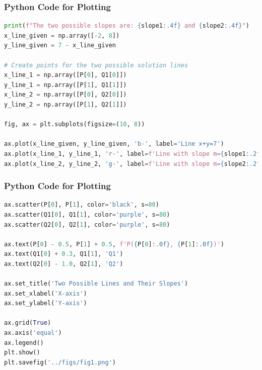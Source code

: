 \documentclass{beamer}
\theoremstyle{remark}
\numberwithin{equation}{section}
\begin{document}
\begin{frame}[fragile]
\frametitle{Python Code for Plotting}
\begin{lstlisting}[language=Python]
print(f"The two possible slopes are: {slope1:.4f} and {slope2:.4f}")
x_line_given = np.array([-2, 8])
y_line_given = 7 - x_line_given

# Create points for the two possible solution lines
x_line_1 = np.array([P[0], Q1[0]])
y_line_1 = np.array([P[1], Q1[1]])
x_line_2 = np.array([P[0], Q2[0]])
y_line_2 = np.array([P[1], Q2[1]])

fig, ax = plt.subplots(figsize=(10, 8))

ax.plot(x_line_given, y_line_given, 'b-', label='Line x+y=7')
ax.plot(x_line_1, y_line_1, 'r-', label=f'Line with slope m={slope1:.2f}')
ax.plot(x_line_2, y_line_2, 'g-', label=f'Line with slope m={slope2:.2f}')
\end{lstlisting}
\end{frame}

\begin{frame}[fragile]
\frametitle{Python Code for Plotting}
\begin{lstlisting}[language=Python] 
ax.scatter(P[0], P[1], color='black', s=80)
ax.scatter(Q1[0], Q1[1], color='purple', s=80)
ax.scatter(Q2[0], Q2[1], color='purple', s=80)

ax.text(P[0] - 0.5, P[1] + 0.5, f'P({P[0]:.0f}, {P[1]:.0f})')
ax.text(Q1[0] + 0.3, Q1[1], 'Q1')
ax.text(Q2[0] - 1.0, Q2[1], 'Q2')

ax.set_title('Two Possible Lines and Their Slopes')
ax.set_xlabel('X-axis')
ax.set_ylabel('Y-axis')

ax.grid(True)
ax.axis('equal')
ax.legend()
plt.show()
plt.savefig('../figs/fig1.png')
\end{lstlisting}
\end{frame}
\end{document}

